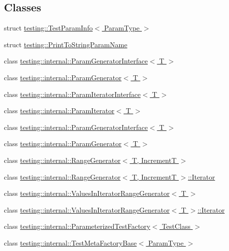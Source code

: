 \subsection*{Classes}
\begin{DoxyCompactItemize}
\item 
struct \hyperlink{structtesting_1_1TestParamInfo}{testing\+::\+Test\+Param\+Info$<$ Param\+Type $>$}
\item 
struct \hyperlink{structtesting_1_1PrintToStringParamName}{testing\+::\+Print\+To\+String\+Param\+Name}
\item 
class \hyperlink{classtesting_1_1internal_1_1ParamGeneratorInterface}{testing\+::internal\+::\+Param\+Generator\+Interface$<$ T $>$}
\item 
class \hyperlink{classtesting_1_1internal_1_1ParamGenerator}{testing\+::internal\+::\+Param\+Generator$<$ T $>$}
\item 
class \hyperlink{classtesting_1_1internal_1_1ParamIteratorInterface}{testing\+::internal\+::\+Param\+Iterator\+Interface$<$ T $>$}
\item 
class \hyperlink{classtesting_1_1internal_1_1ParamIterator}{testing\+::internal\+::\+Param\+Iterator$<$ T $>$}
\item 
class \hyperlink{classtesting_1_1internal_1_1ParamGeneratorInterface}{testing\+::internal\+::\+Param\+Generator\+Interface$<$ T $>$}
\item 
class \hyperlink{classtesting_1_1internal_1_1ParamGenerator}{testing\+::internal\+::\+Param\+Generator$<$ T $>$}
\item 
class \hyperlink{classtesting_1_1internal_1_1RangeGenerator}{testing\+::internal\+::\+Range\+Generator$<$ T, Increment\+T $>$}
\item 
class \hyperlink{classtesting_1_1internal_1_1RangeGenerator_1_1Iterator}{testing\+::internal\+::\+Range\+Generator$<$ T, Increment\+T $>$\+::\+Iterator}
\item 
class \hyperlink{classtesting_1_1internal_1_1ValuesInIteratorRangeGenerator}{testing\+::internal\+::\+Values\+In\+Iterator\+Range\+Generator$<$ T $>$}
\item 
class \hyperlink{classtesting_1_1internal_1_1ValuesInIteratorRangeGenerator_1_1Iterator}{testing\+::internal\+::\+Values\+In\+Iterator\+Range\+Generator$<$ T $>$\+::\+Iterator}
\item 
class \hyperlink{classtesting_1_1internal_1_1ParameterizedTestFactory}{testing\+::internal\+::\+Parameterized\+Test\+Factory$<$ Test\+Class $>$}
\item 
class \hyperlink{classtesting_1_1internal_1_1TestMetaFactoryBase}{testing\+::internal\+::\+Test\+Meta\+Factory\+Base$<$ Param\+Type $>$}

\end{DoxyCompactItemize}
